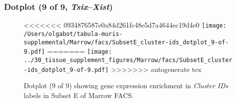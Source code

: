 \clearpage

\subsubsection{Dotplot (9 of 9, \emph{Tsix}--\emph{Xist})}
\begin{figure}[h]
\centering
<<<<<<< 0934876587e0a84d261fc48e5d7a4644ec19d4e0
\texttt{[image: /Users/olgabot/tabula-muris-supplemental/Marrow/facs/SubsetE\_cluster-ids\_dotplot\_9-of-9.pdf]}
=======
\texttt{[image: ../30\_tissue\_supplement\_figures/Marrow/facs/SubsetE\_cluster-ids\_dotplot\_9-of-9.pdf]}
>>>>>>> autogenerate tex

\caption{ Dotplot (9 of 9)  showing gene expression enrichment in \emph{Cluster IDs} labels in Subset E of Marrow FACS. }
\end{figure}

